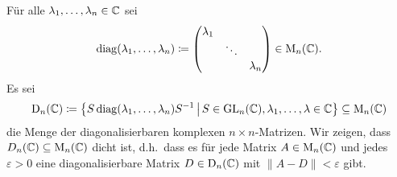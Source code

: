 \documentclass[a4paper,10pt]{scrartcl}
\begin{document}
\begin{question}
  Für alle $\lambda_1, \dotsc, \lambda_n \in \mathbb{C}$ sei
  \[
    \operatorname{\operatorname{diag}}(\lambda_1, \dotsc, \lambda_n)
    \coloneqq
    \begin{pmatrix}
      \lambda_1 &         &           \\
                & \ddots  &           \\
                &         & \lambda_n
    \end{pmatrix}
    \in \operatorname{M}_n(\mathbb{C}).
  \]
  Es sei
  \[
    \operatorname{D}_n(\mathbb{C})
    \coloneqq
    \left\{
      S \operatorname{\operatorname{diag}}(\lambda_1, \dotsc, \lambda_n) S^{-1}
    \,\middle|\,
      S \in \operatorname{GL}_n(\mathbb{C}),
      \lambda_1, \dotsc, \lambda \in \mathbb{C}
    \right\}
    \subseteq \operatorname{M}_n(\mathbb{C})
  \]
  die Menge der diagonalisierbaren komplexen $n \times n$-Matrizen.
  Wir zeigen, dass $D_n(\mathbb{C}) \subseteq \operatorname{M}_n(\mathbb{C})$ dicht ist, d.h.\ dass es für jede Matrix $A \in \operatorname{M}_n(\mathbb{C})$ und jedes $\varepsilon > 0$ eine diagonalisierbare Matrix $D \in \operatorname{D}_n(\mathbb{C})$ mit $\|A-D\| < \varepsilon$ gibt.
  

\end{question}
\end{document}

